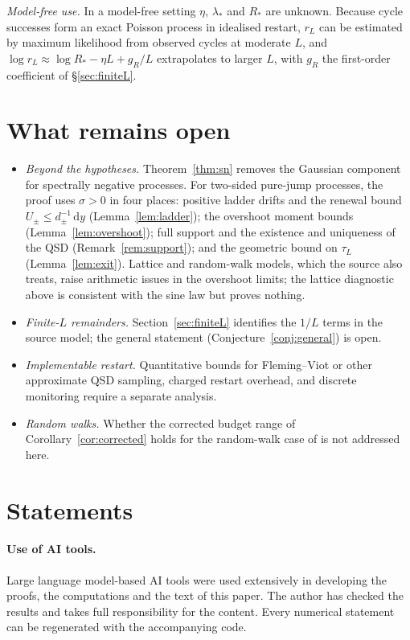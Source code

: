 \documentclass[11pt,a4paper]{article}
\theoremstyle{definition}
\theoremstyle{remark}
\newcommand{\1}{\mathbf 1}
\newcommand{\dd}{\,\mathrm d}
\begin{document}
\emph{Model-free use.} In a model-free setting $\eta$, $\lambda_*$ and $R_*$ are unknown. Because cycle successes form an exact Poisson process in idealised restart, $r_L$ can be estimated by maximum likelihood from observed cycles at moderate $L$, and $\log r_L\approx\log R_*-\eta L+g_R/L$ extrapolates to larger $L$, with $g_R$ the first-order coefficient of \S\ref{sec:finiteL}.

\section{What remains open}\label{sec:open}
\begin{itemize}
\item \emph{Beyond the hypotheses.} Theorem~\ref{thm:sn} removes the Gaussian component for spectrally negative processes. For two-sided pure-jump processes, the proof uses $\sigma>0$ in four places: positive ladder drifts and the renewal bound $U_\pm\le d_\pm^{-1}\dd y$ (Lemma~\ref{lem:ladder}); the overshoot moment bounds (Lemma~\ref{lem:overshoot}); full support and the existence and uniqueness of the QSD (Remark~\ref{rem:support}); and the geometric bound on $\tau_L$ (Lemma~\ref{lem:exit}). Lattice and random-walk models, which the source also treats, raise arithmetic issues in the overshoot limits; the lattice diagnostic above is consistent with the sine law but proves nothing.
\item \emph{Finite-$L$ remainders.} Section~\ref{sec:finiteL} identifies the $1/L$ terms in the source model; the general statement (Conjecture~\ref{conj:general}) is open.
\item \emph{Implementable restart.} Quantitative bounds for Fleming--Viot or other approximate QSD sampling, charged restart overhead, and discrete monitoring require a separate analysis.
\item \emph{Random walks.} Whether the corrected budget range of Corollary~\ref{cor:corrected} holds for the random-walk case of \cite[Theorem 3.14]{garcia} is not addressed here.
\end{itemize}

\section*{Statements}
\paragraph{Use of AI tools.} Large language model-based AI tools were used extensively in developing the proofs, the computations and the text of this paper. The author has checked the results and takes full responsibility for the content. Every numerical statement can be regenerated with the accompanying code.
\end{document}
